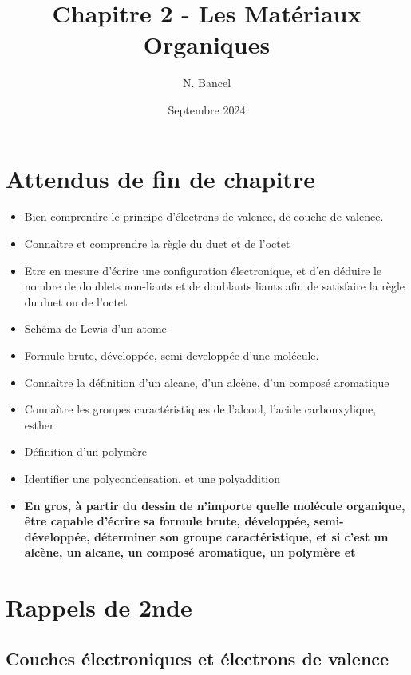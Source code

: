 \documentclass{article}
\title{Chapitre 2 - Les Matériaux Organiques}
\author{N. Bancel}
\date{Septembre 2024}
\begin{document}
\maketitle


\section{Attendus de fin de chapitre}


\begin{tcolorbox}[colback=red!10!white, colframe=red!75!black, title="Ce qu'il faut à tout prix retenir / savoir faire"]
  \begin{itemize}[noitemsep]
    \item Bien comprendre le principe d'électrons de valence, de couche de valence. 
    \item Connaître et comprendre la règle du duet et de l'octet
    \item Etre en mesure d'écrire une configuration électronique, et d'en déduire le nombre de doublets non-liants et de doublants liants afin de satisfaire la règle du duet ou de l'octet 
    \item Schéma de Lewis d'un atome 
    \item Formule brute, développée, semi-developpée d'une molécule.
    \item Connaître la définition d'un alcane, d'un alcène, d'un composé aromatique 
    \item Connaître les groupes caractéristiques de l'alcool, l'acide carbonxylique, esther
    \item Définition d'un polymère
    \item Identifier une polycondensation, et une polyaddition
    \item \textbf{En gros, à partir du dessin de n'importe quelle molécule organique, être capable d'écrire sa formule brute, développée, semi-développée, déterminer son groupe caractéristique, et si c'est un alcène, un alcane, un composé aromatique, un polymère et}
  \end{itemize}

\end{tcolorbox}


\section{Rappels de 2nde}

\subsection{Couches électroniques et électrons de valence}
\end{document}
